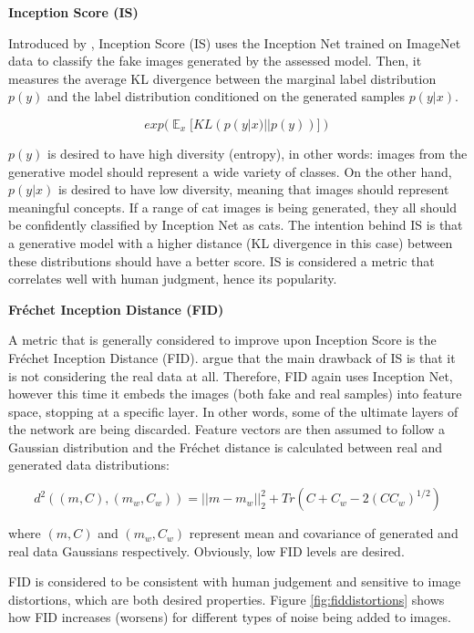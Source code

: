 \documentclass[
]{krantz}
\begin{document}
\textbf{Inception Score (IS)}

Introduced by \citet{InceptionScore2016}, Inception Score (IS) uses the Inception Net \citep{InceptionNet2015} trained on ImageNet data to classify the fake images generated by the assessed model. Then, it measures the average KL divergence between the marginal label distribution \(p(y)\) and the label distribution conditioned on the generated samples \(p(y|x)\).

\[exp(\mathop{{}\mathbb{E}}_{x}[KL(p(y|x) || p(y))])\]

\(p(y)\) is desired to have high diversity (entropy), in other words: images from the generative model should represent a wide variety of classes. On the other hand, \(p(y|x)\) is desired to have low diversity, meaning that images should represent meaningful concepts. If a range of cat images is being generated, they all should be confidently classified by Inception Net as cats. The intention behind IS is that a generative model with a higher distance (KL divergence in this case) between these distributions should have a better score. IS is considered a metric that correlates well with human judgment, hence its popularity.

\textbf{Fréchet Inception Distance (FID)}

A metric that is generally considered to improve upon Inception Score is the Fréchet Inception Distance (FID). \citet{FID2017} argue that the main drawback of IS is that it is not considering the real data at all. Therefore, FID again uses Inception Net, however this time it embeds the images (both fake and real samples) into feature space, stopping at a specific layer. In other words, some of the ultimate layers of the network are being discarded. Feature vectors are then assumed to follow a Gaussian distribution and the Fréchet distance is calculated between real and generated data distributions:

\[d^2((m, C), (m_{w}, C_{w})) = ||m-m_{w}||_{2}^2 + Tr(C+C_{w}-2(CC_{w})^{1/2})\]

where \((m, C)\) and \((m_{w}, C_{w})\) represent mean and covariance of generated and real data Gaussians respectively. Obviously, low FID levels are desired.

FID is considered to be consistent with human judgement and sensitive to image distortions, which are both desired properties. Figure \ref{fig:fiddistortions} shows how FID increases (worsens) for different types of noise being added to images.
\end{document}
